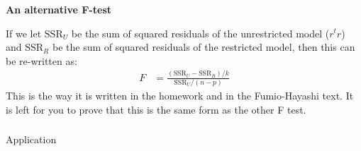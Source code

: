 \begin{frame}[fragile] \frametitle{}

{\bf An alternative F-test}

If we let $\text{SSR}_U$ be the sum of squared residuals of the unrestricted
model ($r^t r$) and $\text{SSR}_R$ be the sum of squared residuals of the
restricted model, then this can be re-written as:
\begin{align*}
F &= \frac{(\text{SSR}_U -  \text{SSR}_R) / k }{\text{SSR}_U / (n - p)}
\end{align*}
This is the way it is written in the homework and in the Fumio-Hayashi
text. It is left for you to prove that this is the same form as the
other F test.

\end{frame}

\begin{frame}[fragile] \frametitle{}

\begin{flushright}
{\color{yaleblue}\sc\fontsize{1cm}{0cm}\selectfont Application}
\end{flushright}

\end{frame}













